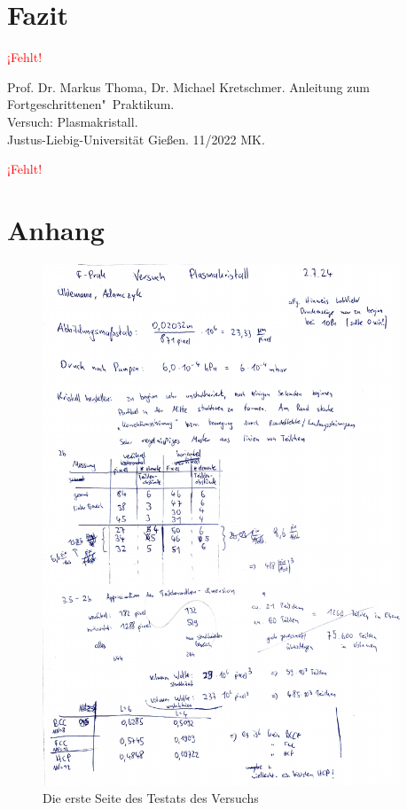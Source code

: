 \documentclass[12pt,a4paper,ngerman]{report}
\providecommand{\fehlt}{\textcolor{red}{{ ¡Fehlt! }}}
\begin{document}
\chapter{Fazit}
	\fehlt

\listoffigures%
	
\begin{thebibliography}{111}%
	Prof. Dr. Markus Thoma, Dr. Michael Kretschmer. Anleitung zum Fortgeschrittenen"~Praktikum.\\ \glqq Versuch: Plasmakristall\grqq.\\ Justus-Liebig-Universität Gießen. 11/2022 MK.
	
		\fehlt
	\end{thebibliography}


\chapter*{Anhang}\label{ch:Anhang}
\FloatBarrier



\begin{figure}[ht]
	\centering
	\includegraphics[width=0.95\textwidth, page=1]{data/Testat_Plasmakristall.pdf}		
	\caption[Testat 1]{Die erste Seite des Testats des Versuchs}
	\label{fig:Testat}
\end{figure}
\end{document}
